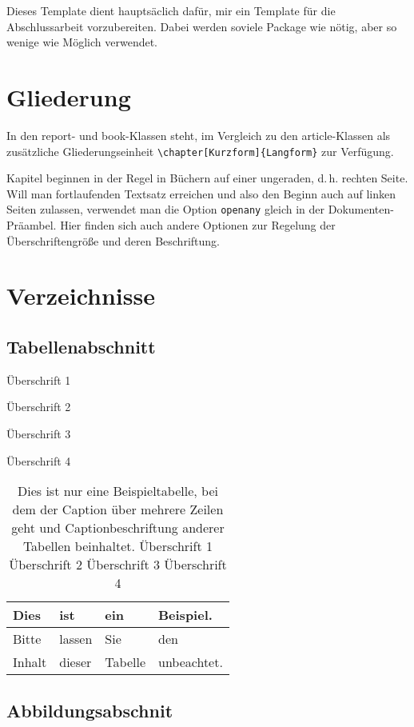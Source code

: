 \documentclass[a4paper,
	openany,							%
	headsepline,					%
	footsepline,					%
	headings = normal,
	toc  	 = chapterentrywithdots,
	listof = totoc,
	listof = entryprefix,
	bibliography = totoc	%
]
{scrbook}
\begin{document}
Dieses Template dient hauptsäclich dafür, mir ein Template für die Abschlussarbeit vorzubereiten. Dabei werden soviele Package wie nötig, aber so wenige wie Möglich verwendet.

\mainmatter						%

\chapter{Gliederung}

In den report- und book-Klassen steht, im Vergleich zu den article-Klassen als zusätzliche Gliederungseinheit \verb#\chapter[Kurzform]{Langform}# zur Verfügung. 

Kapitel beginnen in der Regel in Büchern auf einer ungeraden, d.\,h. rechten Seite. Will man fortlaufenden Textsatz erreichen und also den Beginn auch auf linken Seiten zulassen, verwendet man die Option \verb#openany# gleich in der Dokumenten-Präambel. Hier finden sich auch andere Optionen zur Regelung der Überschriftengröße und deren Beschriftung.

\chapter{Verzeichnisse}
\label{sec:Verzeichnisse}
\section{Tabellenabschnitt}
\label{sec:Tabellenabschnitt}

\begin{table}[h!]
	\caption{Überschrift 1}
	\caption{Überschrift 2}
	\caption{Überschrift 3}
	\caption{Überschrift 4}
	\caption{Dies ist nur eine Beispieltabelle, bei dem der Caption über mehrere Zeilen geht und Captionbeschriftung anderer Tabellen beinhaltet. Überschrift 1 Überschrift 2 Überschrift 3 Überschrift 4}
	\centering
	\begin{tabular}{|l|l|l|l|}\hline
		Dies & ist & ein & Beispiel.\\\hline
		Bitte & lassen & Sie & den \\\hline
		Inhalt & dieser & Tabelle & unbeachtet.\\\hline
	\end{tabular}
\end{table}

	\section{Abbildungsabschnit}
	\label{sec:Abbildungsabschnit}
\end{document}
